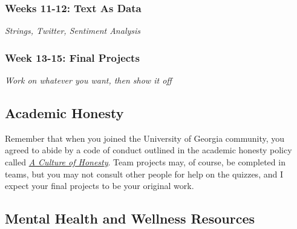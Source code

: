 \documentclass[11pt, letterpaper]{article}
\begin{document}
\subsubsection*{Weeks 11-12: Text As Data}
\textit{Strings, Twitter, Sentiment Analysis}

\subsubsection*{Week 13-15: Final Projects}
\textit{Work on whatever you want, then show it off}






\subsection*{Academic Honesty}
Remember that when you joined the University of Georgia community, you agreed to abide by a code of conduct outlined in the academic honesty policy called \href{https://honesty.uga.edu/Academic-Honesty-Policy/Introduction/}{\textit{A Culture of Honesty}}. Team projects may, of course, be completed in teams, but you may not consult other people for help on the quizzes, and I expect your final projects to be your original work.

\subsection*{Mental Health and Wellness Resources}
\end{document}

